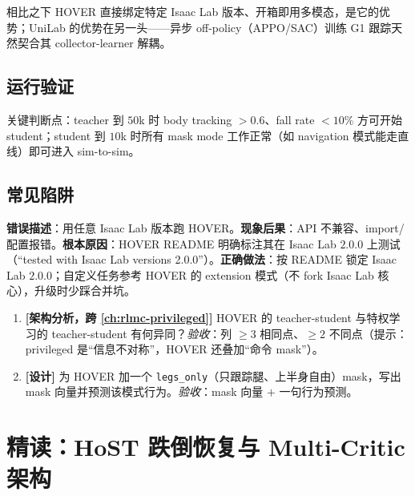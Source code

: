 相比之下 HOVER 直接绑定特定 Isaac Lab 版本、开箱即用多模态，是它的优势；UniLab 的优势在另一头——异步 off-policy（APPO/SAC）训练 G1 跟踪天然契合其 collector-learner 解耦。

\subsection{运行验证}
关键判断点：teacher 到 $50$k 时 body tracking $>0.6$、fall rate $<10\%$ 方可开始 student；student 到 $10$k 时所有 mask mode 工作正常（如 navigation 模式能走直线）即可进入 sim-to-sim。

\subsection{常见陷阱}
\begin{pitfall}
\textbf{错误描述}：用任意 Isaac Lab 版本跑 HOVER。\textbf{现象后果}：API 不兼容、import/配置报错。\textbf{根本原因}：HOVER README 明确标注其在 Isaac Lab $2.0.0$ 上测试（“tested with Isaac Lab versions 2.0.0”）。\textbf{正确做法}：按 README 锁定 Isaac Lab $2.0.0$；自定义任务参考 HOVER 的 extension 模式（不 fork Isaac Lab 核心），升级时少踩合并坑。
\end{pitfall}

\begin{practice}[本节动手]
\begin{enumerate}
  \item \textbf{[架构分析，跨 \cref{ch:rlmc-privileged}]} HOVER 的 teacher-student 与特权学习的 teacher-student 有何异同？\emph{验收}：列 $\geq 3$ 相同点、$\geq 2$ 不同点（提示：privileged 是“信息不对称”，HOVER 还叠加“命令 mask”）。
  \item \textbf{[设计]} 为 HOVER 加一个 \texttt{legs\_only}（只跟踪腿、上半身自由）mask，写出 mask 向量并预测该模式行为。\emph{验收}：mask 向量 $+$ 一句行为预测。
\end{enumerate}
\end{practice}

\section{精读：HoST 跌倒恢复与 Multi-Critic 架构}\label{sec:rlmc-hl-host}

